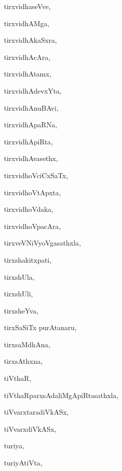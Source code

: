 \begin{multicols}{3}
{\noindent
{tirxvidhaseVve}, \pageref{tirxvidhaseVve}

\noindent
{tirxvidhAMga}, \pageref{tirxvidhAMga}

\noindent
{tirxvidhAkaSxra}, \pageref{tirxvidhAkaSxra}

\noindent
{tirxvidhAcAra}, \pageref{tirxvidhAcAra}

\noindent
{tirxvidhAtamx}, \pageref{tirxvidhAtamx}

\noindent
{tirxvidhAdevxYta}, \pageref{tirxvidhAdevxYta}

\noindent
{tirxvidhAnuBAvi}, \pageref{tirxvidhAnuBAvi}

\noindent
{tirxvidhApaRNa}, \pageref{tirxvidhApaRNa}

\noindent
{tirxvidhApiRta}, \pageref{tirxvidhApiRta}

\noindent
{tirxvidhAvasethx}, \pageref{tirxvidhAvasethx}

\noindent
{tirxvidhoVciCxSaTx}, \pageref{tirxvidhoVciCxSaTx}

\noindent
{tirxvidhoVtApxta}, \pageref{tirxvidhoVtApxta}

\noindent
{tirxvidhoVdaka}, \pageref{tirxvidhoVdaka}

\noindent
{tirxvidhoVpacAra}, \pageref{tirxvidhoVpacAra}

\noindent
{tirxveVNiVyoVgasathxla}, \pageref{tirxveVNiVyoVgasathxla}

\noindent
{tirxshakitxpati}, \pageref{tirxshakitxpati}

\noindent
{tirxshUla}, \pageref{tirxshUla}

\noindent
{tirxshUli}, \pageref{tirxshUli}

\noindent
{tirxsheYva}, \pageref{tirxsheYva}

\noindent
{tirxSaSiTx purAtanaru}, \pageref{tirxSaSiTx purAtanaru}

\noindent
{tirxsaMdhAna}, \pageref{tirxsaMdhAna}

\noindent
{tirxsAthxna}, \pageref{tirxsAthxna}

\noindent
{tiVthaR}, \pageref{tiVthaR}

\noindent
{tiVthaRparxsAdaliMgApiRtasathxla}, \pageref{tiVthaRparxsAdaliMgApiRtasathxla}

\noindent
{tiVvarxtaradiVkASx}, \pageref{tiVvarxtaradiVkASx}

\noindent
{tiVvarxdiVkASx}, \pageref{tiVvarxdiVkASx}

\noindent
{turiya}, \pageref{turiya}

\noindent
{turiyAtiVta}, \pageref{turiyAtiVta}

}
\end{multicols}
